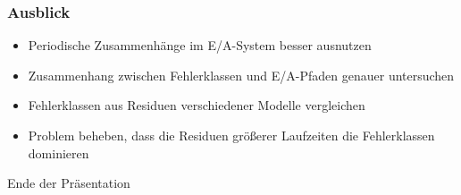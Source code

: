 \documentclass{beamer}
\begin{document}
\begin{frame}
\frametitle{Ausblick}
\begin{itemize}
	\item Periodische Zusammenhänge im E/A-System besser ausnutzen
	\item Zusammenhang zwischen Fehlerklassen und E/A-Pfaden genauer untersuchen
	\item Fehlerklassen aus Residuen verschiedener Modelle vergleichen
	\item Problem beheben, dass die Residuen größerer Laufzeiten die Fehlerklassen dominieren
\end{itemize}	
\end{frame}

\begin{frame}
\Huge{\centerline{Ende der Präsentation}}
\end{frame}

\end{document}

